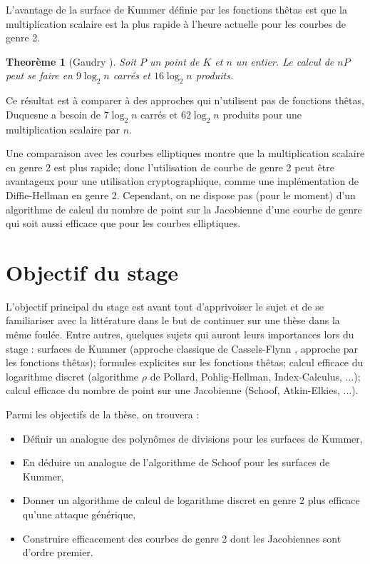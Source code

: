 \documentclass[a4paper]{article}
\newtheorem{theoreme}{Theorème}[section]
\theoremstyle{definition}
\theoremstyle{remark}
\numberwithin{equation}{section}
\begin{document}
L'avantage de la surface de Kummer définie par les fonctions thêtas est que la multiplication scalaire est la plus rapide à l'heure actuelle pour les courbes de genre 2.
\begin{theoreme}[Gaudry \cite{gaudry}]
Soit $P$ un point de $K$ et $n$ un entier. Le calcul de $nP$ peut se faire en $9\log_2 n$ carrés et $16\log_2 n$ produits.
\end{theoreme}

Ce résultat est à comparer à des approches qui n'utilisent pas de fonctions thêtas, Duquesne \cite{duquesne} a besoin de $7\log_2 n$ carrés et $62\log_2 n$ produits pour une multiplication scalaire par $n$.

Une comparaison avec les courbes elliptiques montre que la multiplication scalaire en genre 2 est plus rapide; donc l'utilisation de courbe de genre 2 peut être avantageux pour une utilisation cryptographique, comme une implémentation de Diffie-Hellman en genre 2. Cependant, on ne dispose pas (pour le moment) d'un algorithme de calcul du nombre de point sur la Jacobienne d'une courbe de genre qui soit aussi efficace que pour les courbes elliptiques.

\section{Objectif du stage}
L'objectif principal du stage est avant tout d'apprivoiser le sujet et de se familiariser avec la littérature dans le but de continuer sur une thèse dans la même foulée. Entre autres, quelques sujets qui auront leurs importances lors du stage : surfaces de Kummer (approche classique de Cassels-Flynn \cite{cassels-flynn}, approche par les fonctions thêtas); formules explicites sur les fonctions thêtas; calcul efficace du logarithme discret (algorithme $\rho$ de Pollard, Pohlig-Hellman, Index-Calculus, ...); calcul efficace du nombre de point sur une Jacobienne (Schoof, Atkin-Elkies, ...).

Parmi les objectifs de la thèse, on trouvera :
\begin{itemize}
\item Définir un analogue des polynômes de divisions pour les surfaces de Kummer,
\item En déduire un analogue de l'algorithme de Schoof pour les surfaces de Kummer,
\item Donner un algorithme de calcul de logarithme discret en genre 2 plus efficace qu'une attaque générique,
\item Construire efficacement des courbes de genre 2 dont les Jacobiennes sont d'ordre premier.
\end{itemize}



\end{document}
